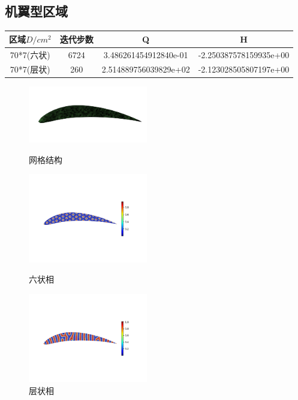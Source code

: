 \documentclass[12pt]{article}
\begin{document}
\begin{CJK}{UTF8}{gkai}
    \subsection{机翼型区域}   
    \begin{table}[H]
    		\centering
    	\begin{tabular}{cccc}
    		\toprule
    		区域$D/cm^2$ &	迭代步数 & Q &  H \\
    		\midrule
    		70*7(六状)&6724 &3.486261454912840e-01 & -2.250387578159935e+00\\
    		70*7(层状)&260 &2.514889756039829e+02& -2.123028505807197e+00\\
    		\bottomrule
    	\end{tabular}
    \end{table}
    
    \begin{figure}[H]
    	\setlength{\abovecaptionskip}{0.cm}
    	\setlength{\belowcaptionskip}{-0.cm}
    	\begin{minipage}[!htbp]{0.3\linewidth}
    		\includegraphics[width=5.2cm]{air_c.png}
    		\caption*{网格结构}
    	\end{minipage}
    	\hspace{0.23in}
    	\begin{minipage}[!htbp]{0.3\linewidth}
    		\includegraphics[width=5.2cm]{scftfigure6720.png}
    		\caption*{六状相}
    	\end{minipage}
    	\hspace{0.23in}
    	\begin{minipage}[!htbp]{0.3\linewidth}
    		\includegraphics[width=5.2cm]{scftfigure260.png}
    		\caption*{层状相}
    	\end{minipage}
    \end{figure} 



\end{CJK}
\end{document}
